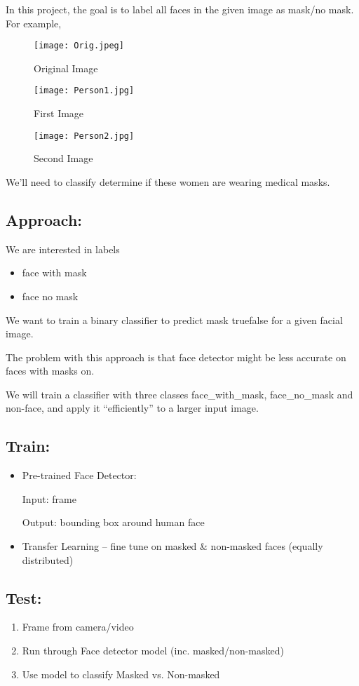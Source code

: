 In this project, the goal is to label all faces in the given image as mask/no mask. For example,

\begin{figure}[H]
    \centering
    \texttt{[image: Orig.jpeg]}
    \caption{Original Image}
    \label{fig:Orig}
\end{figure}

\begin{figure}[H]
    \centering
    \texttt{[image: Person1.jpg]}
    \caption{First Image}
    \label{fig:First}
\end{figure}

\begin{figure}[H]
    \centering
    \texttt{[image: Person2.jpg]}
    \caption{Second Image}
    \label{fig:Second}
\end{figure}

We'll need to classify determine if these women are wearing medical masks.

\subsection{Approach:}
We are interested in labels
\begin{itemize}
    \item face with mask
    \item face no mask
\end{itemize}

We want to train a binary classifier to predict mask true\/false for a given facial image.


The problem with this approach is that face detector might be less accurate on faces with masks on.


We will train a classifier with three classes face\_with\_mask, face\_no\_mask and non-face, and apply it “efficiently” to a larger input image.


\subsection{Train:}
\begin{itemize}
    \item Pre-trained Face Detector:

        Input: frame

	    Output: bounding box around human face
    \item Transfer Learning – fine tune on masked \& non-masked faces (equally distributed)
\end{itemize}


\subsection{Test:}
\begin{enumerate}
    \item Frame from camera/video
    \item Run through Face detector model (inc. masked/non-masked)
    \item Use model to classify Masked  vs. Non-masked
\end{enumerate}


